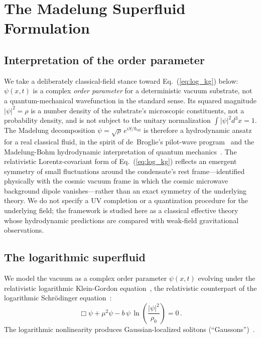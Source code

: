 \documentclass[12pt, a4paper]{article}
\begin{document}
\section{The Madelung Superfluid Formulation}
\label{sec:madelung}

\subsection*{Interpretation of the order parameter}

We take a deliberately classical-field stance toward Eq.~(\ref{eq:log_kg}) below: $\psi(x,t)$ is a complex \emph{order parameter} for a deterministic vacuum substrate, not a quantum-mechanical wavefunction in the standard sense. Its squared magnitude $|\psi|^2 = \rho$ is a number density of the substrate's microscopic constituents, not a probability density, and is not subject to the unitary normalization $\int |\psi|^2 d^3x = 1$. The Madelung decomposition $\psi = \sqrt{\rho}\,e^{iS/\hbar_{\mathrm{eff}}}$ is therefore a hydrodynamic ansatz for a real classical fluid, in the spirit of de~Broglie's pilot-wave program~\cite{deBroglie_1927} and the Madelung-Bohm hydrodynamic interpretation of quantum mechanics~\cite{madelung_1927, bohm_1952, holland_1993}. The relativistic Lorentz-covariant form of Eq.~(\ref{eq:log_kg}) reflects an emergent symmetry of small fluctuations around the condensate's rest frame---identified physically with the cosmic vacuum frame in which the cosmic microwave background dipole vanishes---rather than an exact symmetry of the underlying theory. We do not specify a UV completion or a quantization procedure for the underlying field; the framework is studied here as a classical effective theory whose hydrodynamic predictions are compared with weak-field gravitational observations.

\subsection{The logarithmic superfluid}

We model the vacuum as a complex order parameter $\psi(x,t)$ evolving under the relativistic logarithmic Klein-Gordon equation~\cite{rosen_1969,bartkowski_gorka_2008}, the relativistic counterpart of the logarithmic Schr\"{o}dinger equation~\cite{bialynicki_birula_1979}:
\begin{equation}
    \Box\psi + \mu^2\psi - b\,\psi\,\ln\!\left(\frac{|\psi|^2}{\rho_0}\right) = 0\,.
\label{eq:log_kg}
\end{equation}
The logarithmic nonlinearity produces Gaussian-localized solitons (``Gaussons'')~\cite{bialynicki_birula_1979,avdeenkov_2011}.
\end{document}
